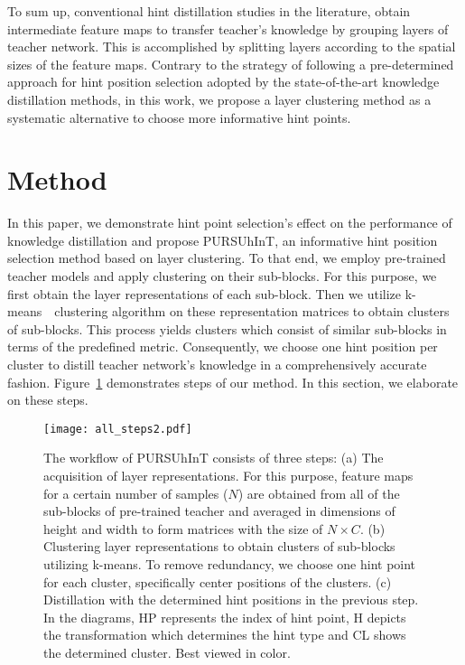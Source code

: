 \documentclass[final,3p,times]{elsarticle}
\begin{document}
To sum up, conventional hint distillation studies in the literature, obtain intermediate feature maps to transfer teacher's knowledge by grouping layers of teacher network. This is accomplished by splitting layers according to the spatial sizes of the feature maps. Contrary to the strategy of following a pre-determined approach for hint position selection adopted by the state-of-the-art knowledge distillation methods, in this work, we propose a layer clustering method as a systematic alternative to choose more informative hint points.  


\section{Method}
\label{sec:method}

In this paper, we demonstrate hint point selection's effect on the performance of knowledge distillation and propose PURSUhInT, an informative hint position selection method based on layer clustering. To that end, we employ pre-trained teacher models and apply clustering on their sub-blocks. For this purpose, we first obtain the layer representations of each sub-block. Then we utilize k-means~\citep{k-means}~clustering algorithm on these representation matrices to obtain clusters of sub-blocks. This process yields clusters which consist of similar sub-blocks in terms of the predefined metric. Consequently, we choose one hint position per cluster to distill teacher network's knowledge in a comprehensively accurate fashion. Figure~\ref{fig:all_steps} demonstrates steps of our method. In this section, we elaborate on these steps.


	\begin{figure}[H]
		\centering
		\texttt{[image: all\_steps2.pdf]}
		\caption{The workflow of PURSUhInT consists of three steps: (a) 
		The acquisition of layer representations. For this purpose, feature maps for a certain number of samples ($N$) are obtained from all of the sub-blocks of pre-trained teacher and averaged in dimensions of height and width to form matrices with the size of $N \times C$. 
		(b) Clustering layer representations to obtain clusters of sub-blocks utilizing k-means. To remove redundancy, we choose one hint point for each cluster, specifically center positions of the clusters. 
		(c) Distillation with the determined hint positions in the previous step. In the diagrams, HP represents the index of hint point, H depicts the transformation which determines the hint type and CL shows the determined cluster. Best viewed in color.}
		\label{fig:all_steps}
	\end{figure}
\end{document}
